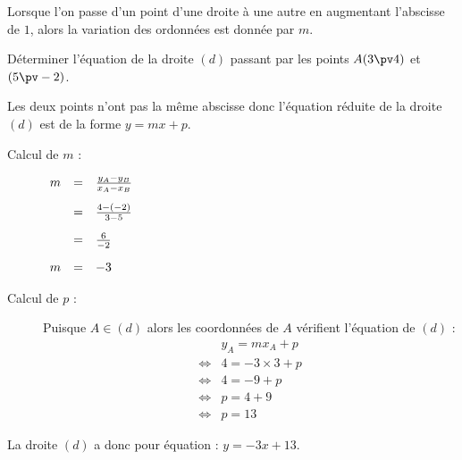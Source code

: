 \documentclass[10pt,openright,twoside,french]{book}
\begin{document}
\begin{Rmq}
    Lorsque l'on passe d'un point d'une droite à une autre en augmentant l'abscisse de $1$, alors la variation des ordonnées est donnée par $m$.
\end{Rmq}

\begin{Exemple}
    Déterminer l'équation de la droite $(d)$ passant par les points $A(3 \pv 4)$ et $(5 \pv -2)$.\par\medskip
    Les deux points n'ont pas la même abscisse donc l'équation réduite de la droite $(d)$ est de la forme $y = mx + p$.\par
    \begin{multicols}{2}
    \begin{description}
        \item[Calcul de $m$ :] $\begin{array}[t]{rcl}
                                                    m & = & \frac{y_A - y_B}{x_A - x_B}\\[10pt]
                                                        & = & \frac{4 - (-2)}{3 - 5}\\[10pt]
                                                        & = & \frac{6}{-2}\\[10pt]
                                                    m &= & -3
                                                \end{array}$
        \item[Calcul de $p$ :] Puisque $A \in (d)$ alors les coordonnées de $A$ vérifient l'équation de $(d)$ :
        \[\begin{array}{ll}
            & y_A = mx_A + p \\
            \Leftrightarrow & 4 = -3 \times 3 + p \\
            \Leftrightarrow & 4 = -9 + p \\
            \Leftrightarrow & p = 4 + 9 \\
            \Leftrightarrow & p = 13
        \end{array}\]
    \end{description}
        \end{multicols}
        La droite $(d)$ a donc pour équation : $y = -3x + 13$.
\end{Exemple}
\end{document}
